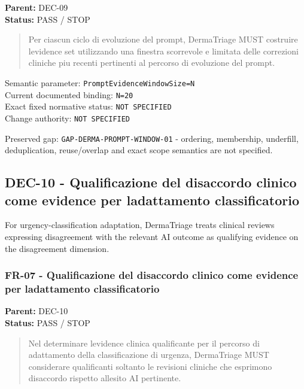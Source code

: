 \documentclass[11pt,a4paper]{article}
\begin{document}
\textbf{Parent:} DEC-09\\
\textbf{Status:} PASS / STOP

\begin{quote}
Per ciascun ciclo di evoluzione del prompt, DermaTriage MUST costruire
l\textquotesingle evidence set utilizzando una finestra scorrevole e
limitata delle correzioni cliniche piu\textquotesingle{} recenti
pertinenti al percorso di evoluzione del prompt.
\end{quote}

Semantic parameter: \texttt{PromptEvidenceWindowSize=N}\\
Current documented binding: \texttt{N=20}\\
Exact fixed normative status: \texttt{NOT\ SPECIFIED}\\
Change authority: \texttt{NOT\ SPECIFIED}

Preserved gap: \texttt{GAP-DERMA-PROMPT-WINDOW-01} - ordering,
membership, underfill, deduplication, reuse/overlap and exact scope
semantics are not specified.

\subsection{DEC-10 - Qualificazione del disaccordo clinico come evidence
per l\textquotesingle adattamento
classificatorio}\label{dec-10---qualificazione-del-disaccordo-clinico-come-evidence-per-ladattamento-classificatorio}

For urgency-classification adaptation, DermaTriage treats clinical
reviews expressing disagreement with the relevant AI outcome as
qualifying evidence on the disagreement dimension.

\subsubsection{FR-07 - Qualificazione del disaccordo clinico come
evidence per l\textquotesingle adattamento
classificatorio}\label{fr-07---qualificazione-del-disaccordo-clinico-come-evidence-per-ladattamento-classificatorio}

\textbf{Parent:} DEC-10\\
\textbf{Status:} PASS / STOP

\begin{quote}
Nel determinare l\textquotesingle evidence clinica qualificante per il
percorso di adattamento della classificazione di urgenza, DermaTriage
MUST considerare qualificanti soltanto le revisioni cliniche che
esprimono disaccordo rispetto all\textquotesingle esito AI pertinente.
\end{quote}
\end{document}
